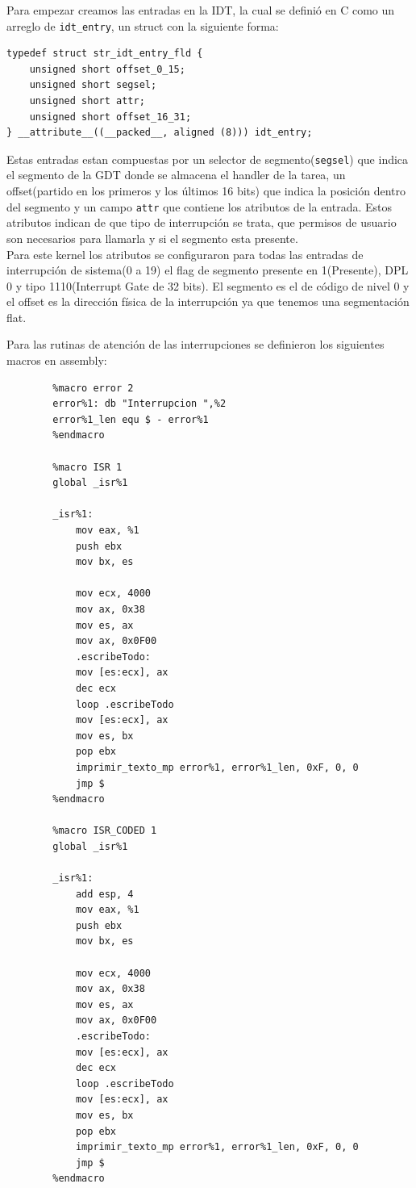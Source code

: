 \documentclass[10pt, a4paper]{article}
\begin{document}
Para empezar creamos las entradas en la IDT, la cual se defini\'o en C como un arreglo de \verb+idt_entry+, un struct con la siguiente forma:
\begin{verbatim}
typedef struct str_idt_entry_fld {
	unsigned short offset_0_15;
	unsigned short segsel;
	unsigned short attr;
	unsigned short offset_16_31;
} __attribute__((__packed__, aligned (8))) idt_entry;
\end{verbatim}
Estas entradas estan compuestas por un selector de segmento(\verb+segsel+) que indica el segmento de la GDT donde se almacena el handler de la tarea, un offset(partido en los primeros y los \'ultimos 16 bits) que indica la posici\'on dentro del segmento y un campo \verb+attr+ que contiene los atributos de la entrada. Estos atributos indican de que tipo de interrupci\'on se trata, que permisos de usuario son necesarios para llamarla y si el segmento esta presente.\\
Para este kernel los atributos se configuraron para todas las entradas de interrupci\'on de sistema(0 a 19) el flag de segmento presente en 1(Presente), DPL 0 y tipo 1110(Interrupt Gate de 32 bits). El segmento es el de c\'odigo de nivel 0 y el offset es la direcci\'on f\'isica de la interrupci\'on ya que tenemos una segmentaci\'on flat.\newline

Para las rutinas de atenci\'on de las interrupciones se definieron los siguientes macros en assembly:

\begin{center}
		\begin{verbatim}
		%macro error 2
		error%1: db "Interrupcion ",%2
		error%1_len equ $ - error%1
		%endmacro

		%macro ISR 1
		global _isr%1

		_isr%1:
			mov eax, %1
			push ebx
			mov bx, es
			
			mov ecx, 4000
			mov ax, 0x38
			mov es, ax
			mov ax, 0x0F00
			.escribeTodo:
			mov [es:ecx], ax
			dec ecx
			loop .escribeTodo
			mov [es:ecx], ax
			mov es, bx
			pop ebx
			imprimir_texto_mp error%1, error%1_len, 0xF, 0, 0
			jmp $
		%endmacro

		%macro ISR_CODED 1
		global _isr%1

		_isr%1:
			add esp, 4
			mov eax, %1
			push ebx
			mov bx, es
			
			mov ecx, 4000
			mov ax, 0x38
			mov es, ax
			mov ax, 0x0F00
			.escribeTodo:
			mov [es:ecx], ax
			dec ecx
			loop .escribeTodo
			mov [es:ecx], ax
			mov es, bx
			pop ebx
			imprimir_texto_mp error%1, error%1_len, 0xF, 0, 0
			jmp $
		%endmacro
	\end{verbatim}
\end{center}
\end{document}
